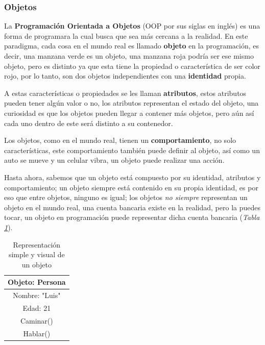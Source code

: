 \subsubsection{Objetos}
\hspace{0.55cm}La \textbf{Programación Orientada a Objetos} (OOP por sus siglas en inglés) es una forma de programara la cual busca que sea más cercana a la realidad. En este paradigma, cada cosa en el mundo real es llamado \textbf{objeto} en la programación, es decir, una manzana verde es un objeto, una manzana roja podría ser ese mismo objeto, pero es distinto ya que esta tiene la propiedad o característica de ser color rojo, por lo tanto, son dos objetos independientes con una \textbf{identidad} propia.

A estas características o propiedades se les llaman \textbf{atributos}, estos atributos pueden tener algún valor o  no, los atributos representan el estado del objeto, una curiosidad es que los objetos pueden llegar a contener más objetos, pero aún así cada uno dentro de este será distinto a su contenedor.

Los objetos, como en el mundo real, tienen un \textbf{comportamiento}, no solo características, este comportamiento también puede definir al objeto, así como un auto se mueve y un celular vibra, un objeto puede realizar una acción.

Hasta ahora, sabemos que un objeto está compuesto por su identidad, atributos y comportamiento; un objeto siempre está contenido en su propia identidad, es por eso que entre objetos, ninguno es igual; los objetos \textit{no siempre} representan un objeto en el mundo real, una cuenta bancaria existe en la realidad, pero la puedes tocar, un objeto en programación puede representar dicha cuenta bancaria (\textit{Tabla \ref{tab: 13}}).
\begin{table}[H]
    \begin{center}
        \caption{Representación simple y visual de un objeto}
        \label{tab: 13}
        \begin{tabular}{|c|}
            \hline
            Objeto: Persona \\
            \hline
            Nombre: "Luis" \\
            Edad: 21 \\
            \hline
            Caminar() \\
            Hablar() \\
            \hline
        \end{tabular}
    \end{center}
\end{table}



